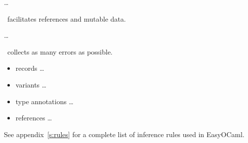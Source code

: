 \dots

\easyocaml\ facilitates references and mutable data.

\dots

\easyocaml\ collects as many errors as possible.

\begin{itemize}
    \item records \ldots{}
    \item variants \ldots{}
    \item type annotations \ldots{}
    \item references \ldots{}
\end{itemize}

See appendix~\ref{s:rules} for a complete list of inference rules used 
in EasyOCaml.
